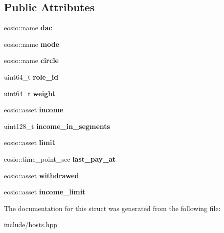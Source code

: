 \subsection*{Public Attributes}
\begin{DoxyCompactItemize}
\item 
\mbox{\label{structeosio_1_1dacs_a131bbf5532f3cfd920d6c15550c65ab8}} 
eosio\+::name {\bfseries dac}
\item 
\mbox{\label{structeosio_1_1dacs_a5616e221cbf295e5f390cd42ab2ea06d}} 
eosio\+::name {\bfseries mode}
\item 
\mbox{\label{structeosio_1_1dacs_ae0340a519a4db9d2fe558b7ae178682a}} 
eosio\+::name {\bfseries circle}
\item 
\mbox{\label{structeosio_1_1dacs_a0a7d8af13b02e7bed58a0116f2276a4b}} 
uint64\+\_\+t {\bfseries role\+\_\+id}
\item 
\mbox{\label{structeosio_1_1dacs_a51d81e53098c437b70ab3452f3e9a124}} 
uint64\+\_\+t {\bfseries weight}
\item 
\mbox{\label{structeosio_1_1dacs_a37e605a52a34e34672cab05b341738cb}} 
eosio\+::asset {\bfseries income}
\item 
\mbox{\label{structeosio_1_1dacs_a8344caa10e203ded14207c0c286cf800}} 
uint128\+\_\+t {\bfseries income\+\_\+in\+\_\+segments}
\item 
\mbox{\label{structeosio_1_1dacs_af455156921dd4032e13e6a501e417bc8}} 
eosio\+::asset {\bfseries limit}
\item 
\mbox{\label{structeosio_1_1dacs_abe06820b52c9968e516641c7b12d7d2d}} 
eosio\+::time\+\_\+point\+\_\+sec {\bfseries last\+\_\+pay\+\_\+at}
\item 
\mbox{\label{structeosio_1_1dacs_acf5b0b451838b16a47c983ed139a4014}} 
eosio\+::asset {\bfseries withdrawed}
\item 
\mbox{\label{structeosio_1_1dacs_aa8a175efecf64dfd5339a381e971e406}} 
eosio\+::asset {\bfseries income\+\_\+limit}
\end{DoxyCompactItemize}


The documentation for this struct was generated from the following file\+:\begin{DoxyCompactItemize}
\item 
include/hosts.\+hpp\end{DoxyCompactItemize}
